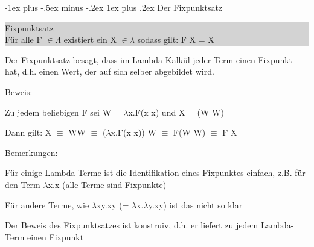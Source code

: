 \documentclass[10pt]{article}
\makeatletter
\renewcommand{\subsubsection}{\@startsection{subsubsection}{3}{0mm}%
                                {-1ex plus -.5ex minus -.2ex}%
                                {1ex plus .2ex}%
                                {\normalfont\small\bfseries}}
\makeatother
\begin{document}
\begin{itemize*}
\subsubsection{Der Fixpunktsatz}
\colorbox{lightgray}{
  \begin{minipage}[h]{1.0\linewidth}
    Fixpunktsatz \\
    Für alle F $\in \Lambda$ existiert ein X $\in \lambda$ sodass gilt: F X = X
  \end{minipage}
}
\newline
\begin{itemize*}
  \item Der Fixpunktsatz besagt, dass im Lambda-Kalkül jeder Term einen Fixpunkt hat, d.h. einen Wert, der auf sich selber abgebildet wird.
  \item Beweis:
  \begin{itemize*}
    \item Zu jedem beliebigen F sei W = $\lambda$x.F(x x) und X = (W W)
    \item Dann gilt: X $\equiv$ WW $\equiv$ ($\lambda$x.F(x x)) W $\equiv$ F(W W) $\equiv$ F X
  \end{itemize*}
  \item Bemerkungen:
  \begin{itemize*}
    \item Für einige Lambda-Terme ist die Identifikation eines Fixpunktes einfach, z.B. für den Term $\lambda$x.x (alle Terme sind Fixpunkte)
    \item Für andere Terme, wie $\lambda$xy.xy (= $\lambda$x.$\lambda$y.xy) ist das nicht so klar
    \item Der Beweis des Fixpunktsatzes ist konstruiv, d.h. er liefert zu jedem Lambda-Term einen Fixpunkt
  \end{itemize*}
\end{itemize*}

\end{itemize*}
\end{document}
